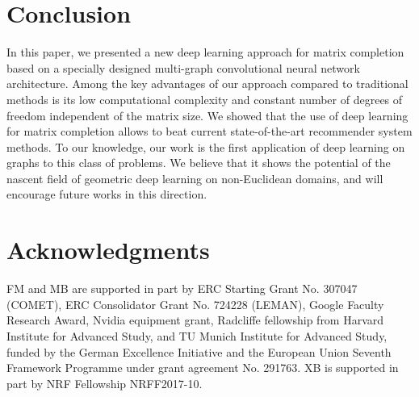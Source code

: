 \documentclass{article}
\begin{document}
 


\section{Conclusion}
\label{sec:conc}

In this paper, we presented a new deep learning approach for matrix completion based on a specially designed multi-graph convolutional neural network architecture. Among the key advantages of our approach compared to traditional methods is its low computational complexity and constant number of degrees of freedom independent of the matrix size. We showed that the use of deep learning for matrix completion allows to beat current state-of-the-art recommender system methods. To our knowledge, our work is the first application of deep learning on graphs to this class of problems. We believe that it shows the potential of the nascent field of geometric deep learning on non-Euclidean domains, and will encourage future works in this direction. 

 


\section{Acknowledgments}
FM and MB are supported in part by ERC Starting Grant No. 307047 (COMET), ERC Consolidator Grant No. 724228 (LEMAN), Google Faculty Research Award, Nvidia equipment grant, Radcliffe fellowship from Harvard Institute for Advanced Study, and TU Munich Institute for Advanced Study, funded by the German Excellence Initiative and the European Union Seventh Framework Programme under grant agreement No. 291763. XB is supported in part by NRF Fellowship NRFF2017-10. 




\end{document}
